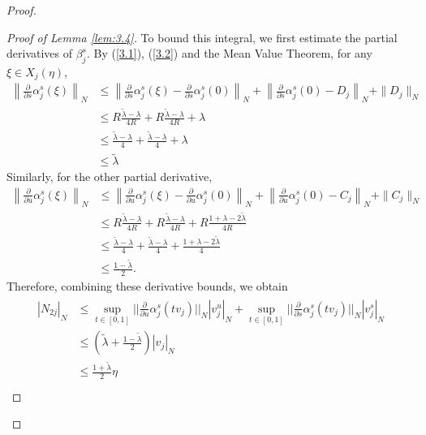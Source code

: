 \documentclass[12pt]{article}
\begin{document}
\begin{proof}
\begin{proof}[Proof of Lemma \ref{lem:3.4}]
		To bound this integral, we first estimate the partial derivatives of $ \beta_j^s $. By (\ref{3.1}), (\ref{3.2}) and the Mean Value Theorem, for any $\xi \in X_{j}(\eta)$,
		$$\begin{alignedat}{2}
			\left\|\frac{\partial}{\partial s} \alpha_j^s(\xi)\right\|_{N}&\leqslant \left\|\frac{\partial}{\partial s} \alpha_j^s(\xi)-\frac{\partial}{\partial s} \alpha_j^s(0) \right\|_{N} + \left\|\frac{\partial}{\partial s} \alpha																																	_j^s(0)-D_{j} \right\|_{N} + \|D_{j} \|_{N}\\
			&\leqslant R\frac{\widetilde\lambda-\lambda}{4R}+R\frac{\widetilde\lambda-\lambda}{4R}  + \lambda   \\
			&\leqslant \frac{\widetilde\lambda-\lambda}{4}+ \frac{\widetilde\lambda-\lambda}{4}+ \lambda\\
			&\leqslant \widetilde\lambda\end{alignedat}
		$$
		Similarly, for the other partial derivative,
		$$\begin{alignedat}{2}
			\left\|\frac{\partial}{\partial u} \alpha_j^s(\xi)\right\|_{N}& \leq
			\left\|\frac{\partial}{\partial u} \alpha_j^s(\xi)-\frac{\partial}{\partial u} \alpha_j^s(0) \right\|_{N}+\left\|\frac{\partial}{\partial u} \alpha_j^s(0)-C_{j} \right\|_{N}  +\|C_{j} \|_{N}\\
			&\leqslant R\frac{\widetilde\lambda-\lambda}{4R}+R\frac{\widetilde\lambda-\lambda}{4R}  + R\frac{1+\lambda-2\widetilde\lambda}{4R}\\
			&\leqslant \frac{\widetilde\lambda-\lambda}{4}+ \frac{\widetilde\lambda-\lambda}{4}+ \frac{1+\lambda-2\widetilde\lambda}{4}\\
			&\leqslant  \frac{1-\widetilde\lambda}{2} .
		\end{alignedat}
		$$
		Therefore, combining these derivative bounds, we obtain
		\begin{align} \label{3.16}
			\begin{split}
				|N_{2j}|_{N}
				&\leqslant \underset{t\in [0,1]}{\sup}||\frac{\partial}{\partial u}\alpha_{j}^{s}(tv_{j})||_{N}|v_{j}^{u}|_{N}+\underset{t\in [0,1]}{\sup}||\frac{\partial}{\partial s}\alpha_{j}^{s}(tv_{j})||_{N}|v_{j}^{s}|_{N} \\
				&\leqslant (\widetilde\lambda +\frac{1-\widetilde\lambda}{2} ) \left|v_j\right|_{N}\\
				&\leqslant \frac{1+\widetilde\lambda}{2}  \eta \\
			\end{split}
		\end{align}
		

\end{proof}
\end{proof}
\end{document}
